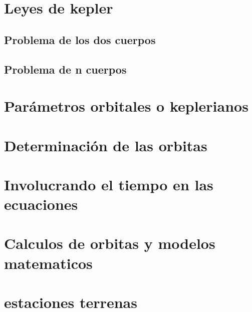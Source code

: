 \section{Leyes de kepler}
\subsection{Problema de los dos cuerpos}
\subsection{Problema de n cuerpos} 
\section{Parámetros orbitales o keplerianos}
\section{Determinación de las orbitas} 

\section{Involucrando el tiempo en las ecuaciones} 
\section{Calculos de orbitas y modelos matematicos}
\section{estaciones terrenas}